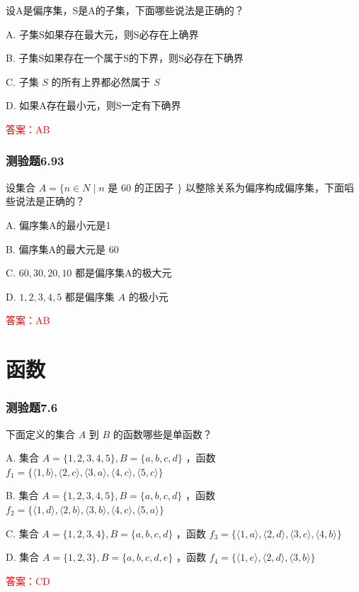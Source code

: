 \documentclass[UTF8, heading=true]{ctexart}
\begin{document}
设A是偏序集，S是A的子集，下面哪些说法是正确的？

A. 子集S如果存在最大元，则S必存在上确界

B. 子集S如果存在一个属于S的下界，则S必存在下确界

C. 子集 $S$ 的所有上界都必然属于 $S$

D. 如果A存在最小元，则S一定有下确界

\textcolor{red}{答案：AB}

\subsubsection{测验题6.93}

设集合 $A=\{n \in N \mid n$ 是 60 的正因子 $\}$ 以整除关系为偏序构成偏序集，下面㗖些说法是正确的？

A. 偏序集A的最小元是1

B. 偏序集A的最大元是 60

C.  $60,30,20,10$ 都是偏序集A的极大元

D. $1,2,3,4,5$ 都是偏序集 $A$ 的极小元

\textcolor{red}{答案：AB}




\clearpage

\section{函数}


\subsubsection{测验题7.6}

下面定义的集合 $A$ 到 $B$ 的函数哪些是单函数？

A. 集合 $A=\{1,2,3,4,5\}, B=\{a, b, c, d\}$ ，函数 $f_1=\{\langle 1, b\rangle,\langle 2, c\rangle,\langle 3, a\rangle,\langle 4, c\rangle,\langle 5, c\rangle\}$

B. 集合 $A=\{1,2,3,4,5\}, B=\{a, b, c, d\}$ ，函数 $f_2=\{\langle 1, d\rangle,\langle 2, b\rangle,\langle 3, b\rangle,\langle 4, c\rangle,\langle 5, a\rangle\}$

C. 集合 $A=\{1,2,3,4\}, B=\{a, b, c, d\}$ ，函数 $f_3=\{\langle 1, a\rangle,\langle 2, d\rangle,\langle 3, c\rangle,\langle 4, b\rangle\}$

D. 集合 $A=\{1,2,3\}, B=\{a, b, c, d, e\}$ ，函数 $f_4=\{\langle 1, e\rangle,\langle 2, d\rangle,\langle 3, b\rangle\}$

\textcolor{red}{答案：CD}
\end{document}
